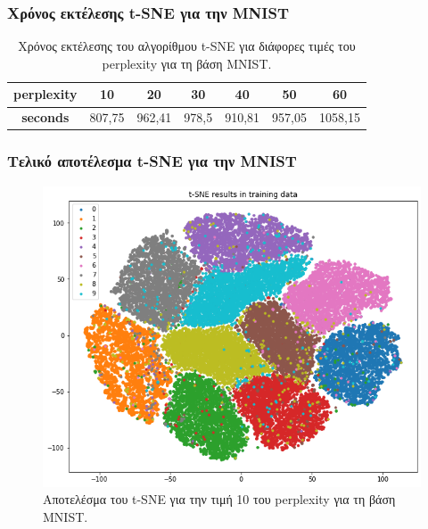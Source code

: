 \documentclass{beamer}
\begin{document}
\begin{frame}
\frametitle{Χρόνος εκτέλεσης t-SNE για την MNIST}

\begin{table}[H]
\centering
\begin{tabular}{|c|c|c|c|c|c|c|}
\hline
\textbf{perplexity} & \textbf{10} & \textbf{20} & \textbf{30} & \textbf{40} & \textbf{50} & \textbf{60} \\ \hline
\textbf{seconds}    & 807,75      & 962,41      & 978,5       & 910,81      & 957,05      & 1058,15     \\ \hline
\end{tabular}
\caption{Χρόνος εκτέλεσης του αλγορίθμου t-SNE για διάφορες τιμές του perplexity
    για τη βάση MNIST.}
\label{tab:mnist_tsne_times}
\end{table}

\end{frame}

\begin{frame}
\frametitle{Τελικό αποτέλεσμα t-SNE για την MNIST}

\begin{figure}[H]
    \centering
    \includegraphics[width=0.6\linewidth]{mnist/tsne_training.png}
    \caption{Αποτελέσμα του t-SNE για την τιμή 10 του perplexity για τη βάση
    MNIST.}
    \label{fig:mnist_tsne}
\end{figure}

\end{frame}
\end{document}

